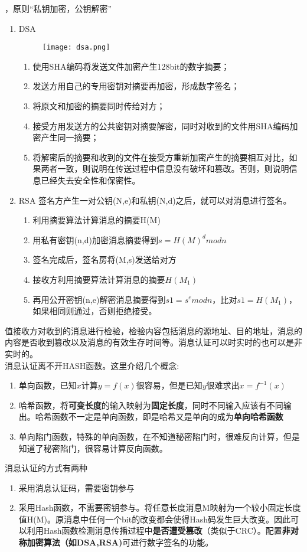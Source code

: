 ，原则“私钥加密，公钥解密”
\begin{enumerate}
	\item DSA
	\begin{figure}[H]
		\centering
		\texttt{[image: dsa.png]}
	\end{figure}
	\begin{enumerate}
		\item 使用SHA编码将发送文件加密产生128bit的数字摘要； 
		\item 发送方用自己的专用密钥对摘要再加密，形成数字签名； 
		\item 将原文和加密的摘要同时传给对方； 
		\item 接受方用发送方的公共密钥对摘要解密，同时对收到的文件用SHA编码加密产生同一摘要； 
		\item 将解密后的摘要和收到的文件在接受方重新加密产生的摘要相互对比，如果两者一致，则说明在传送过程中信息没有破坏和篡改。否则，则说明信息已经失去安全性和保密性。
	\end{enumerate}
	\item RSA
	签名方产生一对公钥(N,e)和私钥(N,d)之后，就可以对消息进行签名。
	\begin{enumerate}
		\item 利用摘要算法计算消息的摘要H(M)
		\item 用私有密钥(n,d)加密消息摘要得到$ s = H(M)^d  mod  n $
		\item 签名完成后，签名房将(M,s)发送给对方
		\item 接收方利用摘要算法计算消息的摘要$ H(M_1) $
		\item 再用公开密钥(n,e)解密消息摘要得到$ s1 = s^e  mod n $，比对$ s1 = H(M_1) $，如果相同则通过，否则拒绝接受。
	\end{enumerate}
\end{enumerate}


 值接收方对收到的消息进行检验，检验内容包括消息的源地址、目的地址，消息的内容是否收到篡改以及消息的有效生存时间等。消息认证可以时实时的也可以是非实时的。\\
消息认证离不开HASH函数。这里介绍几个概念:
\begin{enumerate}
	\item 单向函数，已知$ x $计算$ y=f(x) $很容易，但是已知$ y $很难求出$ x = f^{-1}(x) $
	\item 哈希函数，将\textbf{可变长度}的输入映射为\textbf{固定长度}，同时不同输入应该有不同输出。哈希函数不一定是单向函数，即是哈希又是单向的成为\textbf{单向哈希函数}
	\item 单向陷门函数，特殊的单向函数，在不知道秘密陷门时，很难反向计算，但是知道了秘密陷门，很容易计算反向函数。
\end{enumerate}
消息认证的方式有两种
\begin{enumerate}
	\item 采用消息认证码，需要密钥参与
	\item 采用Hash函数，不需要密钥参与。将任意长度消息M映射为一个较小固定长度值H(M)。原消息中任何一个bit的改变都会使得Hash码发生巨大改变。因此可以利用Hash函数检测消息传播过程中\textbf{是否遭受篡改}（类似于CRC）。配置\textbf{非对称加密算法（如DSA,RSA)}可进行数字签名的功能。
\end{enumerate}  

